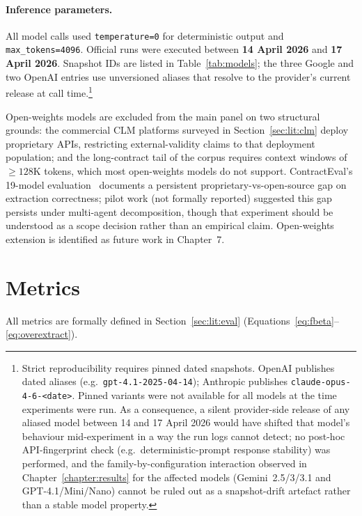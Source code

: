 \paragraph{Inference parameters.}
All model calls used \texttt{temperature=0} for deterministic output and
\texttt{max\_tokens=4096}. Official runs were executed between
\textbf{14 April 2026} and \textbf{17 April 2026}.
Snapshot IDs are listed in Table~\ref{tab:models}; the three Google and two OpenAI
entries use unversioned aliases that resolve to the provider's current release at
call time.\footnote{Strict reproducibility requires pinned dated snapshots.
OpenAI publishes dated aliases (e.g.\ \texttt{gpt-4.1-2025-04-14}); Anthropic
publishes \texttt{claude-opus-4-6-<date>}. Pinned variants were not available for
all models at the time experiments were run. As a consequence, a silent provider-side
release of any aliased model between 14 and 17 April 2026 would have shifted that
model's behaviour mid-experiment in a way the run logs cannot detect; no post-hoc
API-fingerprint check (e.g.\ deterministic-prompt response stability) was
performed, and the family-by-configuration interaction observed in
Chapter~\ref{chapter:results} for the affected models (Gemini~2.5/3/3.1 and
GPT-4.1/Mini/Nano) cannot be ruled out as a snapshot-drift artefact rather
than a stable model property.}

Open-weights models are excluded from the main panel on two structural grounds: the
commercial CLM platforms surveyed in Section~\ref{sec:lit:clm} deploy proprietary APIs,
restricting external-validity claims to that deployment population; and the
long-contract tail of the corpus requires context windows of $\geq 128$K tokens,
which most open-weights models do not support. ContractEval's 19-model evaluation~\cite{liu2025contracteval} documents
a persistent proprietary-vs-open-source gap on extraction correctness; pilot work
(not formally reported) suggested this gap persists under multi-agent decomposition,
though that experiment should be understood as a scope decision rather than an empirical
claim. Open-weights extension is identified as future work in Chapter~7.

\section{Metrics}\label{sec:meth:metrics}

All metrics are formally defined in Section~\ref{sec:lit:eval}
(Equations~\ref{eq:fbeta}--\ref{eq:overextract}).


